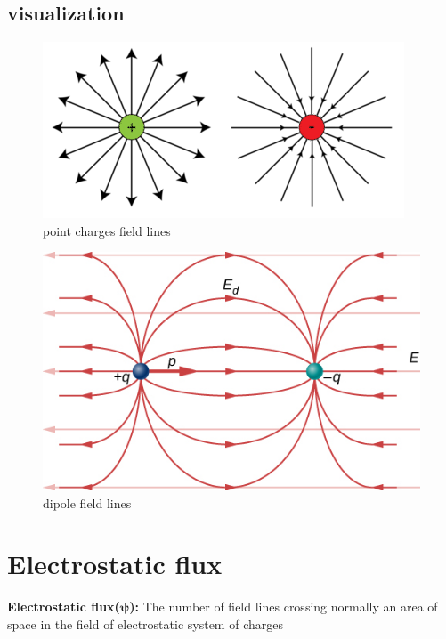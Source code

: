 \documentclass[12 pt]{article}
\begin{document}
\subsection{visualization}
\begin{minipage}{0.5\linewidth}
    \begin{figure}[H]
    \centering
    \includegraphics[scale=0.5]{./images/charges}
    \caption{point charges field lines}
    \label{charges} 
    \end{figure}
\end{minipage}
\begin{minipage}{0.45\linewidth}
    \begin{figure}[H]
    \centering
    \includegraphics[scale=0.68]{./images/dipole}
    \caption{dipole field lines}
    \label{dipole} 
    \end{figure}
\end{minipage}
\section{Electrostatic flux }
\textbf{Electrostatic flux($\mathbf{\psi}$):} The number of field lines crossing normally an area of space in the field of electrostatic system of charges
\end{document}

